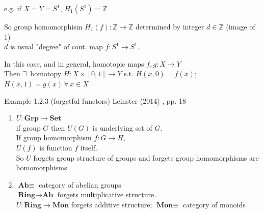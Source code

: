 e.g. if $X=Y = S^1$, $H_1(S^1) = \mathbb{Z}$

So group homomorphism $H_1(f): \mathbb{Z} \to \mathbb{Z}$ determined by integer $d\in \mathbb{Z}$ (image of 1) \\
$d$ is usual "degree" of cont. map $f:S^1 \to S^1$. 

In this case, and in general, homotopic maps $f,g : X \to Y$ \\
Then $\exists \,$ homotopy $H:X \times [0,1] \to Y$ s.t. $H(x,0) = f(x)$; $H(x,1) = g(x) \, \forall \, x \in X$




Example 1.2.3 (forgetful functors) Leinster (2014) \cite{agat:Lein2014}, pp. 18

\begin{enumerate}
	\item[(a)] $U : \textbf{Grp} \to \textbf{Set}$ \\
	if group $G$ then $U(G)$ is underlying set of $G$. \\
	If group homomorphism $f:G \to H$, \\
	$U(f)$ is function $f$ itself. \\
	So $U$ forgets group structure of groups and forgets group homomorphisms are homomorphisms.
	\item[(c)] $\textbf{Ab} \equiv $ category of abelian groups \\
	$\textbf{Ring} \to \textbf{Ab}$ forgets multiplicative structure. \\
	$U:\textbf{Ring} \to \textbf{Mon}$ forgets additive structure; $\textbf{Mon} \equiv $ category of monoids
\end{enumerate}




